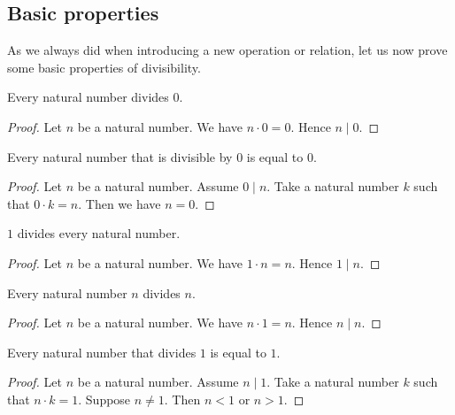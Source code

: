 \documentclass[../../arithmetic.tex]{subfiles}
\begin{document}
  \subsection{Basic properties}

  As we always did when introducing a new operation or relation, let us now
  prove some basic properties of divisibility.

  \begin{forthel}
    \begin{proposition}\label{Arithmetic_03_01_148842}
      Every natural number divides $0$.
    \end{proposition}
    \begin{proof}
      Let $n$ be a natural number.
      We have $n \cdot 0 = 0$.
      Hence $n \mid 0$.
    \end{proof}

    \begin{proposition}\label{Arithmetic_03_01_295259}
      Every natural number that is divisible by $0$ is equal to $0$.
    \end{proposition}
    \begin{proof}
      Let $n$ be a natural number.
      Assume $0 \mid n$.
      Take a natural number $k$ such that $0 \cdot k = n$.
      Then we have $n = 0$.
    \end{proof}

    \begin{proposition}\label{Arithmetic_03_01_856465}
      $1$ divides every natural number.
    \end{proposition}
    \begin{proof}
      Let $n$ be a natural number.
      We have $1 \cdot n = n$.
      Hence $1 \mid n$.
    \end{proof}

    \begin{proposition}\label{Arithmetic_03_01_258975}
      Every natural number $n$ divides $n$.
    \end{proposition}
    \begin{proof}
      Let $n$ be a natural number.
      We have $n \cdot 1 = n$.
      Hence $n \mid n$.
    \end{proof}

    \begin{proposition}\label{Arithmetic_03_01_211137}
      Every natural number that divides $1$ is equal to $1$.
    \end{proposition}
    \begin{proof}
      Let $n$ be a natural number.
      Assume $n \mid 1$.
      Take a natural number $k$ such that $n \cdot k = 1$.
      Suppose $n \neq 1$.
      Then $n < 1$ or $n > 1$.


\end{proof}
\end{forthel}
\end{document}
